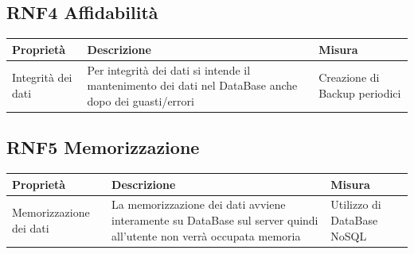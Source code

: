 \documentclass{article}
\begin{document}
\subsection{RNF4 Affidabilità}
\begin{center}
    \begin{longtable}{|p{4cm}|p{8cm}|p{4cm}|}
        \hline
        Proprietà          & Descrizione                                                                                          & Misura                        \\
        \hline
        Integrità dei dati & Per integrità dei dati si intende il mantenimento dei dati nel DataBase anche dopo dei guasti/errori & Creazione di Backup periodici \\
        \hline
    \end{longtable}
\end{center}
\clearpage
\subsection{RNF5 Memorizzazione}
\begin{center}
    \begin{longtable}{|p{4cm}|p{8cm}|p{4cm}|}
        \hline
        Proprietà               & Descrizione                                                                                                        & Misura                     \\
        \hline
        Memorizzazione dei dati & La memorizzazione dei dati avviene interamente su DataBase sul server quindi all'utente non verrà occupata memoria & Utilizzo di DataBase NoSQL \\
        \hline
    \end{longtable}
\end{center}
\end{document}

